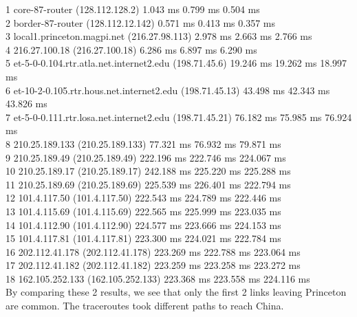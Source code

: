 \documentclass[titlepage, paper=a4, fontsize=11pt]{scrartcl} %
\numberwithin{equation}{section} %
\numberwithin{figure}{section} %
\numberwithin{table}{section} %
\begin{document}
 1  core-87-router (128.112.128.2)  1.043 ms  0.799 ms  0.504 ms \\
 2  border-87-router (128.112.12.142)  0.571 ms  0.413 ms  0.357 ms \\
 3  local1.princeton.magpi.net (216.27.98.113)  2.978 ms  2.663 ms  2.766 ms \\
 4  216.27.100.18 (216.27.100.18)  6.286 ms  6.897 ms  6.290 ms \\
 5  et-5-0-0.104.rtr.atla.net.internet2.edu (198.71.45.6)  19.246 ms  19.262 ms  18.997 ms \\
 6  et-10-2-0.105.rtr.hous.net.internet2.edu (198.71.45.13)  43.498 ms  42.343 ms  43.826 ms \\
 7  et-5-0-0.111.rtr.losa.net.internet2.edu (198.71.45.21)  76.182 ms  75.985 ms  76.924 ms \\
 8  210.25.189.133 (210.25.189.133)  77.321 ms  76.932 ms  79.871 ms \\
 9  210.25.189.49 (210.25.189.49)  222.196 ms  222.746 ms  224.067 ms \\
10  210.25.189.17 (210.25.189.17)  242.188 ms  225.220 ms  225.288 ms \\
11  210.25.189.69 (210.25.189.69)  225.539 ms  226.401 ms  222.794 ms \\
12  101.4.117.50 (101.4.117.50)  222.543 ms  224.789 ms  222.446 ms \\
13  101.4.115.69 (101.4.115.69)  222.565 ms  225.999 ms  223.035 ms \\
14  101.4.112.90 (101.4.112.90)  224.577 ms  223.666 ms  224.153 ms \\
15  101.4.117.81 (101.4.117.81)  223.300 ms  224.021 ms  222.784 ms \\
16  202.112.41.178 (202.112.41.178)  223.269 ms  222.788 ms  223.064 ms \\
17  202.112.41.182 (202.112.41.182)  223.259 ms  223.258 ms  223.272 ms \\
18  162.105.252.133 (162.105.252.133)  223.368 ms  223.558 ms  224.116 ms
\\

By comparing these 2 results, we see that only the first 2 links leaving Princeton are common. The traceroutes took different paths to reach China.
\\


\end{document}
